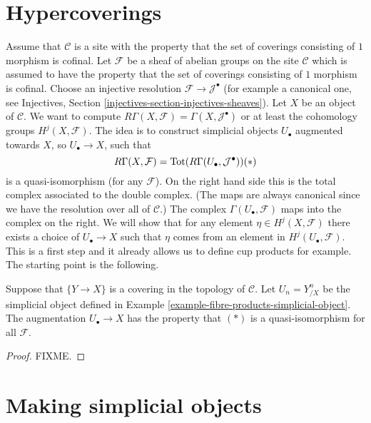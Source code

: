 \section{Hypercoverings}

\noindent
Assume that $\mathcal{C}$ is a site with the property
that the set of coverings consisting of $1$ morphism is cofinal.
Let $\mathcal{F}$ be a sheaf of abelian groups on
the site $\mathcal{C}$ which is assumed to have the property
that the set of coverings consisting of $1$ morphism is cofinal.
Choose an injective resolution $\mathcal{F} \to \mathcal{J}^\bullet$
(for example a canonical one, see 
Injectives, Section \ref{injectives-section-injectives-sheaves}).
Let $X$ be an object of $\mathcal{C}$. We want to compute 
$R\Gamma(X, \mathcal{F}) = \Gamma(X, \mathcal{J}^\bullet)$
or at least the cohomology groups $H^j(X, \mathcal{F})$.
The idea is to construct simplicial objects $U_\bullet$ 
augmented towards $X$, so $U_\bullet \to X$, such that 
$$
R\Gamma(X, \mathcal{F}) 
= \text{Tot}(R\Gamma(U_\bullet, \mathcal{J}^\bullet))
\relax{(*)}
$$
is a quasi-isomorphism (for any $\mathcal{F}$). On the right hand 
side this is the total complex associated to the double complex. 
(The maps are always canonical since we have the resolution over 
all of $\mathcal{C}$.)
The complex $\Gamma(U_\bullet, \mathcal{F})$ maps into the
complex on the right. We will show that for any
element $\eta \in H^j(X, \mathcal{F})$ there exists a choice
of $U_\bullet \to X$ such that $\eta$ comes from an element
in $H^j(U_\bullet, \mathcal{F})$. This is a first step and
it already allows us to define cup products for example.
The starting point is the following.

\begin{lemma}
\label{lemma-product-hypercovering}
Suppose that $\{Y \to X\}$ is a covering in the topology of
$\mathcal{C}$. Let $U_n = Y^n_{/X}$ be the simplicial
object defined in Example \ref{example-fibre-products-simplicial-object}.
The augmentation $U_\bullet \to X$ has the property
that $(*)$ is a quasi-isomorphism for all $\mathcal{F}$.
\end{lemma}

\begin{proof}
FIXME.
\end{proof}

\section{Making simplicial objects}
\label{section-making-simplicial}

